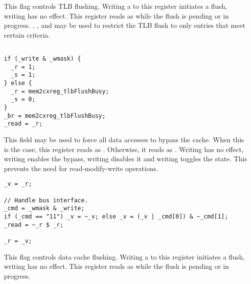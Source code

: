 This flag controls TLB flushing. Writing a  to this register initiates a
flush, writing  has no effect. This register reads as  while the
flush is pending or in progress. , , and  may
be used to restrict the TLB flush to only entries that meet certain criteria.

\declaration{}
\implementation{}
\begin{lstlisting}

if (_write & _wmask) {
  _r = 1;
  _s = 1;
} else {
  _r = mem2cxreg_tlbFlushBusy;
  _s = 0;
}
_br = mem2cxreg_tlbFlushBusy;
_read = _r;

\end{lstlisting}

This field may be used to force all data accesses to bypass the cache. When this 
is the case, this register reads as . Otherwise, it reads as . 
Writing  has no effect, writing  enables the bypass, writing 
 disables it and writing  toggles the state. This prevents the 
need for read-modify-write operations.

\declaration{}
\implementation{}
\begin{lstlisting}
_v = _r;

// Handle bus interface.
_cmd = _wmask & _write;
if (_cmd == "11") _v = ~_v; else _v = (_v | _cmd[0]) & ~_cmd[1];
_read = ~_r $ _r;

_r = _v;
\end{lstlisting}

This flag controls data cache flushing. Writing a  to this register 
initiates a flush, writing  has no effect. This register reads as 
 while the flush is pending or in progress.

